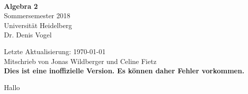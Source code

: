 \documentclass[a4paper, 12pt]{article}
\begin{document}
\begin{titlepage}
	
	\begin{center}
		\ \\ 
		\vspace{3cm}
		{\huge{\bf Algebra 2}}\\
		\vspace{0.8cm}
		{\Large Sommersemester 2018}\\
		\vspace{0.5cm}
		{\Large Universit\"at Heidelberg}
		\\
		\vspace{1cm}
		{\sc Dr. Denis Vogel}
		\vspace{2cm}
		\normalsize{
			\begin{center}
				Letzte Aktualisierung: \today\\
				Mitschrieb von Jonas Wildberger und Celine Fietz\\
				\textbf{Dies ist eine inoffizielle Version. Es können daher Fehler vorkommen.}
			\end{center}
		}
	\end{center}
	
\end{titlepage}
\tableofcontents



Hallo
\end{document}
